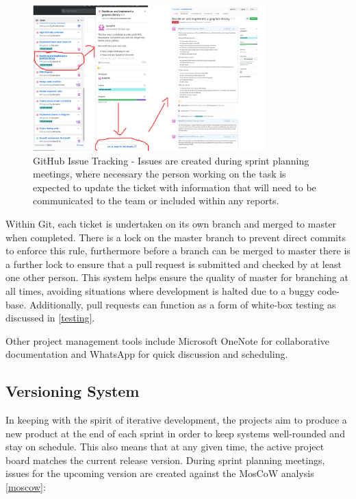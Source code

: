\documentclass[a4paper, oneside, 11pt]{report}
\begin{document}
\begin{figure}[H]
	\centering
	\includegraphics[width=0.8\textwidth]{gitissuetrack}
	\caption{GitHub Issue Tracking - Issues are created during sprint planning meetings, where necessary the person working on the task is expected to update the ticket with information that will need to be communicated to the team or included within any reports.}\label{gitissue}
\end{figure}

Within Git, each ticket is undertaken on its own branch and merged to master when completed. There is a lock on the master branch to prevent direct commits to enforce this rule, furthermore before a branch can be merged to master there is a further lock to ensure that a pull request is submitted and checked by at least one other person. This system helps ensure the quality of master for branching at all times, avoiding situations where development is halted due to a buggy code-base. Additionally, pull requests can function as a form of white-box testing as discussed in \ref{testing}.

Other project management tools include Microsoft OneNote for collaborative documentation and WhatsApp for quick discussion and scheduling.

\subsection{Versioning System}\label{versioning}
In keeping with the spirit of iterative development, the projects aim to produce a new product at the end of each sprint in order to keep systems well-rounded and stay on schedule. This also means that at any given time, the active project board matches the current release version. During sprint planning meetings, issues for the upcoming version are created against the MosCoW analysis \ref{moscow}:
\end{document}
